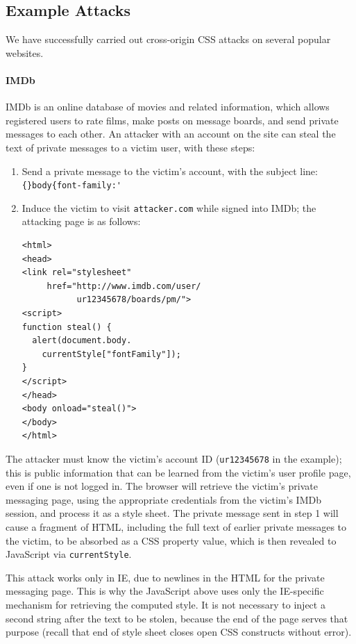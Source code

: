 \documentclass{acm_proc_article-sp}
\begin{document}
\subsection{Example Attacks} \label{sec:demos}
We have successfully carried out cross-origin CSS attacks on several
popular websites.

\paragraph{IMDb}
IMDb is an online database of movies and related information, which
allows registered users to rate films, make posts on message boards,
and send private messages to each other.  An attacker with an account
on the site can steal the text of private messages to a victim user,
with these steps:

\begin{enumerate}
\item Send a private message to the victim's account, with the subject
  line: \verb|{}body{font-family:'|
\item Induce the victim to visit \texttt{attacker.com} while signed
  into IMDb; the attacking page is as follows:
\begin{verbatim}
<html>
<head>
<link rel="stylesheet"
     href="http://www.imdb.com/user/
           ur12345678/boards/pm/">
<script>
function steal() {
  alert(document.body.
    currentStyle["fontFamily"]);
}
</script>
</head>
<body onload="steal()">
</body>
</html>
\end{verbatim}
\end{enumerate}

The attacker must know the victim's account ID (\texttt{ur12345678} in
the example); this is public information that can be learned from the
victim's user profile page, even if one is not logged in.  The browser
will retrieve the victim's private messaging page, using the
appropriate credentials from the victim's IMDb session, and process it
as a style sheet.  The private message sent in step 1 will cause a
fragment of HTML, including the full text of earlier private messages
to the victim, to be absorbed as a CSS property value, which is then
revealed to JavaScript via \texttt{currentStyle}.

This attack works only in IE, due to newlines in the HTML for the
private messaging page.  This is why the JavaScript above uses only
the IE-specific mechanism for retrieving the computed style.  It is
not necessary to inject a second string after the text to be stolen,
because the end of the page serves that purpose (recall that end of
style sheet closes open CSS constructs without error).
\end{document}
